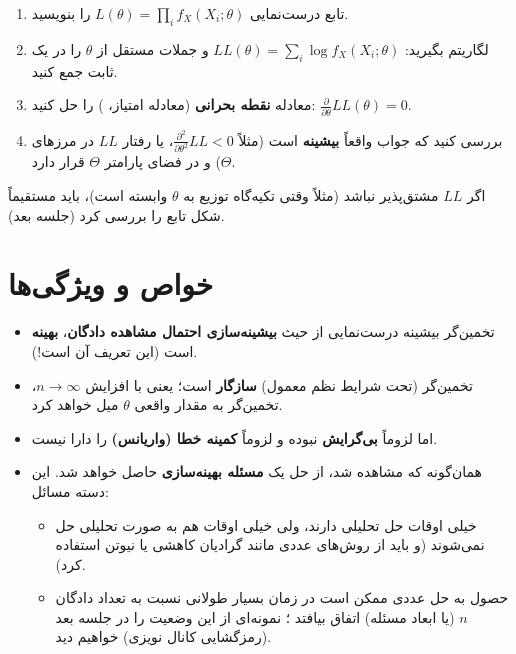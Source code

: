 \begin{summarybox}
\begin{enumerate}
\item تابع درست‌نمایی $L(\theta)=\prod_if_X(X_i;\theta)$ را بنویسید.
\item لگاریتم بگیرید: $LL(\theta)=\sum_i\log f_X(X_i;\theta)$ و جملات مستقل از $\theta$ را در یک ثابت جمع کنید.
\item معادله \textbf{نقطه بحرانی} (معادله امتیاز، ) را حل کنید: $\frac{\partial}{\partial\theta}LL(\theta)=0$.
\item بررسی کنید که جواب واقعاً \textbf{بیشینه} است (مثلاً $\frac{\partial^2}{\partial\theta^2}LL<0$، یا رفتار $LL$ در مرزهای $\Theta$) و در فضای پارامتر $\Theta$ قرار دارد.
\end{enumerate}
اگر $LL$ مشتق‌پذیر نباشد (مثلاً وقتی تکیه‌گاه توزیع به $\theta$ وابسته است)، باید مستقیماً شکل تابع را بررسی کرد (جلسه بعد).
\end{summarybox}

\section{خواص و ویژگی‌ها}
\begin{itemize}
\item تخمین‌گر بیشینه درست‌نمایی از حیث \textbf{بیشینه‌سازی احتمال مشاهده دادگان}، \textbf{بهینه } است (این تعریف آن است!).
\item تخمین‌گر  (تحت شرایط نظم معمول) \textcolor{blue!70!black}{\textbf{سازگار}} است؛ یعنی با افزایش $n\to\infty$، تخمین‌گر به مقدار واقعی $\theta$ میل خواهد کرد.
\item اما لزوماً \textcolor{red!70!black}{\textbf{بی‌گرایش} } نبوده و لزوماً \textcolor{red!70!black}{\textbf{کمینه خطا (واریانس)}} را دارا نیست.
\item همان‌گونه که مشاهده شد،  از حل یک \textbf{مسئله بهینه‌سازی} حاصل خواهد شد. این دسته مسائل:
\begin{itemize}
\item خیلی اوقات حل تحلیلی دارند، ولی خیلی اوقات هم به صورت تحلیلی حل نمی‌شوند (و باید از روش‌های عددی مانند گرادیان کاهشی یا نیوتن استفاده کرد).
\item حصول به حل عددی ممکن است در زمان بسیار طولانی نسبت به تعداد دادگان $n$ (یا ابعاد مسئله) اتفاق بیافتد ؛ نمونه‌ای از این وضعیت را در جلسه بعد (رمزگشایی کانال نویزی) خواهیم دید.
\end{itemize}
\end{itemize}

